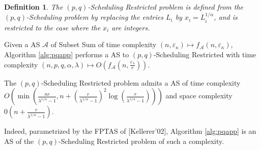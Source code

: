 \documentclass{llncs}
\newtheorem{defi}[theorem]{Definition}
\newcommand{\A}{\ensuremath{\mathcal A}\xspace}
\newcommand{\ek}{\varepsilon_{\kappa}}
\newcommand{\el}{\varepsilon_\lambda}
\newcommand{\pqres}{ {\sc $(p,q)$-Scheduling Restricted}\xspace}
\newcommand{\pqsched}{ {\sc $(p,q)$-Scheduling}\xspace}
\begin{document}
\begin{defi}
\label{def:pqrest}
The \pqres problem is defined from the \pqsched problem by replacing the entries $L_i$ by $x_i = L_i^{1/\alpha}$, and is restricted to the case where the $x_i$ are integers.
\end{defi}






\begin{theorem}
\label{th:pqptas}
Given a AS \A of {\sc Subset Sum} of time complexity $(n,\ek) \mapsto f_\A(n,\ek)$, Algorithm \ref{alg:pqapp} performs a AS to \pqres with time complexity $(n,p,q,\alpha,\lambda) \mapsto O\left(f_\A\left(n,\frac{\el}{r}\right)\right)$.
\end{theorem}

\begin{coro}
The \pqres problem admits a AS of time complexity $O\left(\min\left(\frac{nr}{\lambda^{1/\alpha}-1},n+\left(\frac{r}{\lambda^{1/\alpha}-1}\right)^2\log(\frac{r}{\lambda^{1/\alpha}-1})\right)\right)$ and space complexity $0\left(n+\frac{r}{\lambda^{1/\alpha}-1}\right)$.

Indeed, parametrized by the FPTAS of [Kellerer'02], Algorithm \ref{alg:pqapp} is an AS of the \pqres problem of such a complexity.

\end{coro}
\end{document}
